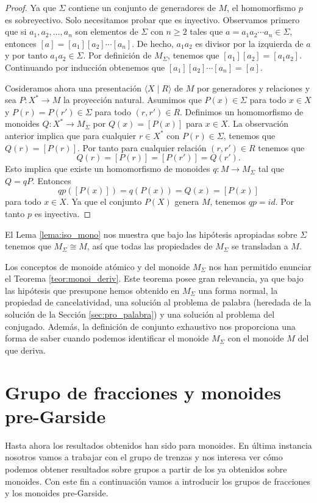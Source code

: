 \documentclass[12pt]{book}
\theoremstyle{definition}
\begin{document}
\begin{proof} Ya que $\Sigma$ contiene un conjunto de generadores de $M$, el homomorfismo $p$ es sobreyectivo. Solo necesitamos probar que es inyectivo. Observamos primero que si $a_1,a_2,\ldots,a_n$ son elementos de $\Sigma$ con $n\geq 2$ tales que $a=a_1a_2\cdots a_n\in\Sigma$, entonces $[a]=[a_1][a_2]\cdots [a_n]$. De hecho, $a_1a_2$ es divisor por la izquierda de $a$ y por tanto $a_1a_2\in\Sigma$. Por definición de $M_\Sigma$, tenemos que $[a_1][a_2]=[a_1a_2]$. Continuando por inducción obtenemos que $[a_1][a_2]\cdots[a_n]=[a]$.

Cosideramos ahora una presentación $\langle X\mid R\rangle$ de $M$ por generadores y relaciones y sea $P:X^*\rightarrow M$ la proyección natural. Asumimos que $P(x)\in\Sigma$ para todo $x\in X$ y $P(r)=P(r')\in\Sigma$ para todo $(r,r')\in R$. Definimos un homomorfismo de monoides $Q:X^*\rightarrow M_\Sigma$ por $Q(x)=[P(x)]$ para $x\in X$. La observación anterior implica que para cualquier $r\in X^*$ con $P(r)\in\Sigma$, tenemos que $Q(r)=[P(r)]$. Por tanto para cualquier relación $(r,r')\in R$ tenemos que
$$Q(r)=[P(r)]=[P(r')]=Q(r').$$
Esto implica que existe un homomorfismo de monoides $q:M\rightarrow M_\Sigma$ tal que $Q=qP$. Entonces
$$qp([P(x)])=q(P(x))=Q(x)=[P(x)]$$
para todo $x\in X$. Ya que el conjunto $P(X)$ genera $M$, tenemos $qp=id$. Por tanto $p$ es inyectiva.
\end{proof}
El Lema \ref{lema:iso_mono} nos muestra que bajo las hipótesis apropiadas sobre $\Sigma$ tenemos que $M_\Sigma\cong M$, así que todas las propiedades de $M_\Sigma$ se transladan a $M$.

Los conceptos de monoide atómico y del monoide $M_\Sigma$ nos han permitido enunciar el Teorema \ref{teor:monoi_deriv}. Este teorema posee gran relevancia, ya que bajo las hipótesis que presupone hemos obtenido en $M_\Sigma$ una forma normal, la propiedad de cancelatividad, una solución al problema de palabra (heredada de la solución de la Sección \ref{sec:pro_palabra}) y una solución al problema del conjugado. Además, la definición de conjunto exhaustivo nos proporciona una forma de saber cuando podemos identificar el monoide $M_\Sigma$ con el monoide $M$ del que deriva.


\section{Grupo de fracciones y monoides pre-Garside}
Hasta ahora los resultados obtenidos han sido para monoides. En última instancia nosotros vamos a trabajar con el grupo de trenzas y nos interesa ver cómo podemos obtener resultados sobre grupos a partir de los ya obtenidos sobre monoides. Con este fin a continuación vamos a introducir los grupos de fracciones y los monoides pre-Garside.
\end{document}

